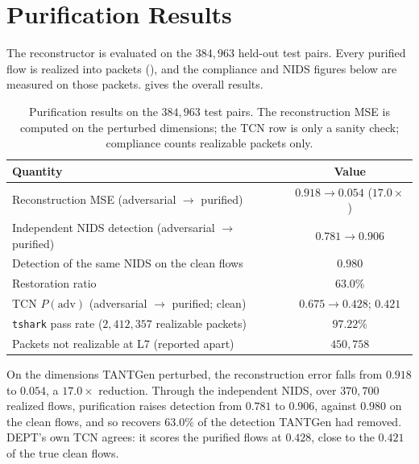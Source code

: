 \section{Purification Results}\label{sec:eval-purification}

The reconstructor is evaluated on the $384{,}963$ held-out test pairs. Every purified
flow is realized into packets (), and the compliance and
\ac{NIDS} figures below are measured on those packets.  gives the
overall results.

\begin{table}[t]
\centering
\caption[Purification results (overall)]{Purification results on the $384{,}963$ test
pairs. The reconstruction MSE is computed on the perturbed dimensions; the TCN row is
only a sanity check; compliance counts realizable packets only.}
\label{tab:eval-purif}
\begin{tabular}{lc}
\toprule
\textbf{Quantity} & \textbf{Value} \\
\midrule
Reconstruction MSE (adversarial $\rightarrow$ purified) & $0.918 \rightarrow \mathbf{0.054}$ ($17.0\times$) \\
Independent NIDS detection (adversarial $\rightarrow$ purified) & $0.781 \rightarrow \mathbf{0.906}$ \\
Detection of the same NIDS on the clean flows & $0.980$ \\
Restoration ratio & $\mathbf{63.0\%}$ \\
TCN $P(\text{adv})$ (adversarial $\rightarrow$ purified; clean) & $0.675 \rightarrow 0.428$; $0.421$ \\
\texttt{tshark} pass rate ($2{,}412{,}357$ realizable packets) & $\mathbf{97.22\%}$ \\
Packets not realizable at L7 (reported apart) & $450{,}758$ \\
\bottomrule
\end{tabular}
\end{table}

On the dimensions TANTGen perturbed, the reconstruction error falls from $0.918$ to
$0.054$, a $17.0\times$ reduction. Through the independent \ac{NIDS}, over $370{,}700$
realized flows, purification raises detection from $0.781$ to $0.906$, against $0.980$
on the clean flows, and so recovers $63.0\%$ of the detection TANTGen had removed.
DEPT's own \ac{TCN} agrees: it scores the purified flows at $0.428$, close to the $0.421$
of the true clean flows.

